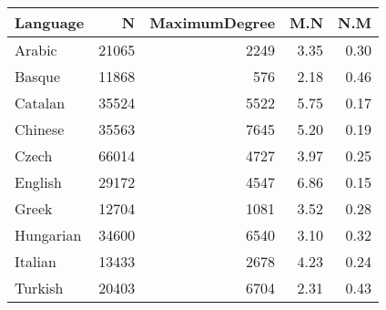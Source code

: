 \begin{table}[ht]
\centering
\begin{tabular}{lrrrr}
  \hline
Language & N & MaximumDegree & M.N & N.M \\ 
  \hline
Arabic & 21065 & 2249 & 3.35 & 0.30 \\ 
  Basque & 11868 & 576 & 2.18 & 0.46 \\ 
  Catalan & 35524 & 5522 & 5.75 & 0.17 \\ 
  Chinese & 35563 & 7645 & 5.20 & 0.19 \\ 
  Czech & 66014 & 4727 & 3.97 & 0.25 \\ 
  English & 29172 & 4547 & 6.86 & 0.15 \\ 
  Greek & 12704 & 1081 & 3.52 & 0.28 \\ 
  Hungarian & 34600 & 6540 & 3.10 & 0.32 \\ 
  Italian & 13433 & 2678 & 4.23 & 0.24 \\ 
  Turkish & 20403 & 6704 & 2.31 & 0.43 \\ 
   \hline
\end{tabular}
\end{table}
